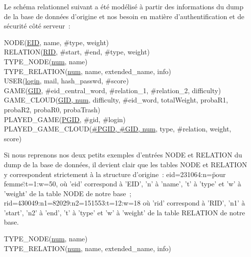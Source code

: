 \documentclass[a4paper,11pt,french]{article}
\begin{document}
Le schéma relationnel suivant a été modélisé à partir des informations du dump de la base de données d'origine et nos besoin en matière d'authentification et de sécurité côté serveur~:

{\footnotesize
NODE(\underline{EID}, name, \#type, weight) \\ 
RELATION(\underline{RID}, \#start, \#end, \#type, weight) \\
TYPE\_NODE(\underline{num}, name) \\
TYPE\_RELATION(\underline{num}, name, extended\_name, info) \\
USER(\underline{login}, mail, hash\_passwd, \#score) \\
GAME(\underline{GID}, \#eid\_central\_word, \#relation\_1, \#relation\_2, difficulty) \\
GAME\_CLOUD(\underline{GID, num}, difficulty, \#eid\_word, totalWeight, probaR1, probaR2, probaR0, probaTrash) \\
PLAYED\_GAME(\underline{PGID}, \#gid, \#login) \\
PLAYED\_GAME\_CLOUD(\underline{\#PGID, \#GID, num}, type, \#relation, weight, score) 
}

Si nous reprenons nos deux petits exemples d'entrées NODE et RELATION du dump de la base de données, il devient clair que les tables NODE et RELATION y correspondent strictement à la structure d'origine~: eid=231064:n=\"pour femme\":t=1:w=50, où 'eid' correspond à 'EID', 'n' à 'name', 't' à 'type' et 'w' à 'weight' de la table NODE de notre base~; rid=430049:n1=82029:n2=151553:t=12:w=18 où 'rid' correspond à 'RID', 'n1' à 'start', 'n2' à 'end', 't' à 'type' et 'w' à 'weight' de la table RELATION de notre base. 



TYPE\_NODE(\underline{num}, name) \\



TYPE\_RELATION(\underline{num}, name, extended\_name, info) \\
\end{document}
